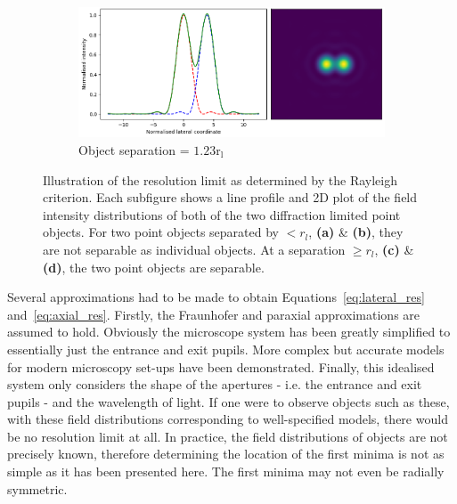 \begin{figure}[h]
\begin{subfigure}{0.49\textwidth}
		\label{fig:Airy_ring_2_object_seperation_1_22}
	\end{subfigure}
	\begin{subfigure}{0.49\textwidth}
		\centering
		\includegraphics[width=\linewidth]{images/Airy_ring_2_object_seperation_1_5.png}
		\caption{Object separation = $1.23\text{r}_{\text{l}}$}
		\label{fig:Airy_ring_2_object_seperation_1_5}
	\end{subfigure}
	\caption[Illustration of the resolution limit as determined by the Rayleigh
		criterion]{Illustration of the resolution limit as determined by the Rayleigh 
		criterion. Each subfigure shows a line profile and 2D plot of the field 
		intensity distributions of both of the two diffraction limited point 
		objects. For two point objects separated by $< r_{l}$, \textbf{(a)} \& 
		\textbf{(b)}, they are not separable as individual objects. At a 
		separation $\ge r_{l}$, \textbf{(c)} \& \textbf{(d)}, the two point 
		objects are separable.}
	\label{fig:Airy_ring_2_object_seperation}
\end{figure}

Several approximations had to be made to obtain Equations~\ref{eq:lateral_res}
and~\ref{eq:axial_res}. Firstly, the Fraunhofer and paraxial approximations are
assumed to hold\cite{goodman2005introduction}. Obviously the microscope system
has been greatly simplified to essentially just the entrance and exit pupils. 
More complex but accurate models for modern microscopy set-ups have been 
demonstrated\cite{torok2007optical, foreman2011computational}. Finally, this
idealised system only considers the shape of the apertures - i.e. the entrance
and exit pupils - and the wavelength of light. If one were to observe objects 
such as these, with these field distributions corresponding to well-specified
models, there would be no resolution limit at all\cite{den1997resolution}. In 
practice, the field distributions of objects are not precisely known, therefore
determining the location of the first minima is not as simple as it has been 
presented here. The first minima may not even be radially symmetric. 

